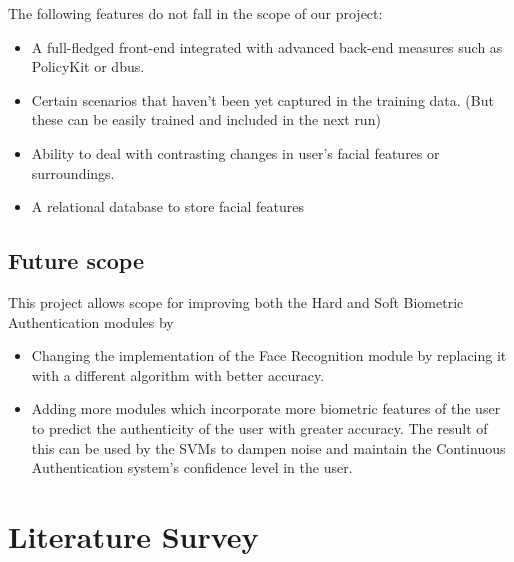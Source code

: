 \documentclass[12pt]{article}			%
\begin{document}
The following features do not fall in the scope of our project:
\begin{itemize}
	\item A full-fledged front-end integrated with advanced back-end measures such as PolicyKit or dbus. 
	\item Certain scenarios that haven't been yet captured in the training data. (But these can be easily trained and included in the next run)
	\item Ability to deal with contrasting changes in user's facial features or surroundings.
	\item A relational database to store facial features
\end{itemize}

\subsection{ Future scope } 
This project allows scope for improving both the Hard and Soft Biometric Authentication modules by
\begin{itemize}
\item Changing the implementation of the Face Recognition module by replacing it with a different algorithm with better accuracy.
\item Adding more modules which incorporate more biometric features of the user to predict the authenticity of the user with greater accuracy. The result of this can be used by the SVMs to dampen noise and maintain the Continuous Authentication system's confidence level in the user.  
\end{itemize}

\newpage

\section{Literature Survey }
\end{document}
